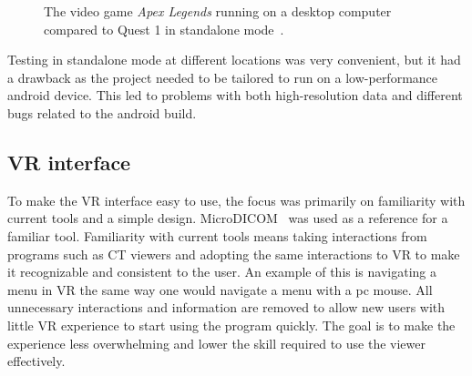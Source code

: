 \documentclass[a4paper]{report}
\begin{document}
\begin{figure}[h!]
    \centering

	\hfill
	\caption{The video game \emph{Apex Legends} running on a desktop computer compared to Quest 1 in standalone mode~\cite{tyriel_wood_-_vr_tech_oculus_2019}.}\label{comp}
  \small

\end{figure}
Testing in standalone mode at different locations was very convenient, but it had a drawback as the project needed to be tailored to run on a low-performance android device. This led to problems with both high-resolution data and different bugs related to the android build.

\subsection{VR interface}


To make the VR interface easy to use, the focus was primarily on familiarity with current tools and a simple design.
MicroDICOM~\cite{noauthor_dicom_nodate-1} was used as a reference for a familiar tool.
Familiarity with current tools means taking interactions from programs such as CT viewers and adopting the same interactions to VR to make it recognizable and consistent to the user. An example of this is navigating a menu in VR the same way one would navigate a menu with a pc mouse.
 All unnecessary interactions and information are removed to allow new users with little VR experience to start using the program quickly. The goal is to make the experience less overwhelming and lower the skill required to use the viewer effectively.
\end{document}
